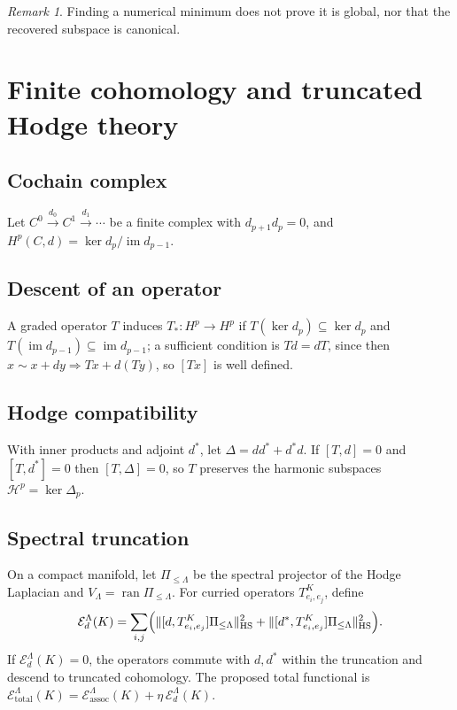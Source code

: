 \documentclass[11pt]{amsart}
\theoremstyle{definition}
\theoremstyle{remark}
\newtheorem{remark}[theorem]{Remark}
\DeclareMathOperator{\ran}{ran}
\begin{document}
\begin{remark}
Finding a numerical minimum does not prove it is global, nor that the
recovered subspace is canonical.
\end{remark}

\section{Finite cohomology and truncated Hodge theory}
\label{sec:xxiii}

\subsection{Cochain complex}

Let $C^0\xrightarrow{d_0}C^1\xrightarrow{d_1}\cdots$ be a finite
complex with $d_{p+1}d_p=0$, and
$H^p(C,d) = \ker d_p/\operatorname{im}d_{p-1}$.

\subsection{Descent of an operator}

A graded operator $T$ induces $T_*:H^p\to H^p$ if
$T(\ker d_p)\subseteq\ker d_p$ and
$T(\operatorname{im}d_{p-1})\subseteq\operatorname{im}d_{p-1}$; a
sufficient condition is $Td=dT$, since then $x\sim x+dy \Rightarrow
Tx+d(Ty)$, so $[Tx]$ is well defined.

\subsection{Hodge compatibility}

With inner products and adjoint $d^*$, let
$\Delta = dd^*+d^*d$. If $[T,d]=0$ and $[T,d^*]=0$ then $[T,\Delta]=0$,
so $T$ preserves the harmonic subspaces $\mathcal H^p=\ker\Delta_p$.

\subsection{Spectral truncation}

On a compact manifold, let $\Pi_{\le\Lambda}$ be the spectral projector
of the Hodge Laplacian and $V_\Lambda=\ran\Pi_{\le\Lambda}$. For
curried operators $T^K_{e_i,e_j}$, define
\[
\mathcal E_d^\Lambda(K) = \sum_{i,j}\Bigl(
\lVert[d,T^K_{e_i,e_j}]\Pi_{\le\Lambda}\rVert_{\mathrm{HS}}^2
+\lVert[d^*,T^K_{e_i,e_j}]\Pi_{\le\Lambda}\rVert_{\mathrm{HS}}^2\Bigr).
\]
If $\mathcal E_d^\Lambda(K)=0$, the operators commute with $d,d^*$
within the truncation and descend to truncated cohomology. The
proposed total functional is
$\mathcal E_{\mathrm{total}}^\Lambda(K) = \mathcal E_{\mathrm{assoc}}^\Lambda(K)+\eta\,\mathcal E_d^\Lambda(K)$.
\end{document}
